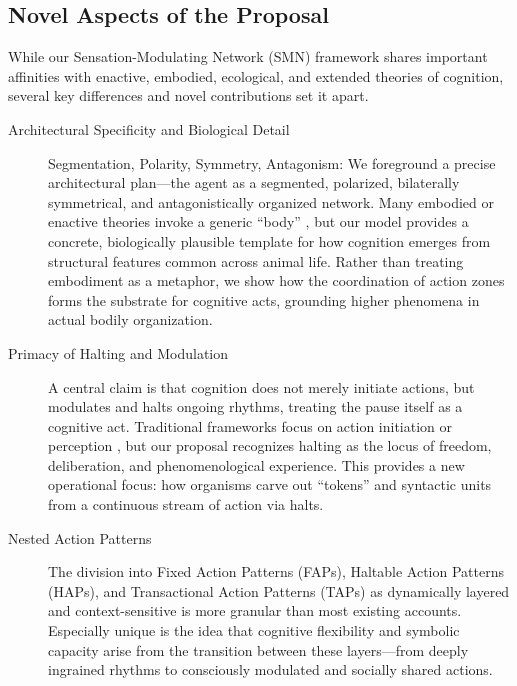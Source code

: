 \subsection{Novel Aspects of the Proposal}
While our Sensation-Modulating Network (SMN) framework shares important affinities with enactive, embodied, ecological, and extended theories of cognition, several key differences and novel contributions set it apart. 
\begin{description}
    \item[Architectural Specificity and Biological Detail] 
    Segmentation, Polarity, Symmetry, Antagonism: We foreground a precise architectural plan—the agent as a segmented, polarized, bilaterally symmetrical, and antagonistically organized network. Many embodied or enactive theories invoke a generic ``body'' \cite{clark1997being, gallagher2005how}, but our model provides a concrete, biologically plausible template for how cognition emerges from structural features common across animal life.      Rather than treating embodiment as a metaphor, we show how the coordination of action zones forms the substrate for cognitive acts, grounding higher phenomena in actual bodily organization.

    \item[Primacy of Halting and Modulation]
    A central claim is that cognition does not merely initiate actions, but modulates and halts ongoing rhythms, treating the pause itself as a cognitive act. Traditional frameworks focus on action initiation or perception \cite{fodor_modularity_1983, chomsky1965aspects}, but our proposal recognizes halting as the locus of freedom, deliberation, and phenomenological experience.  This provides a new operational focus: how organisms carve out “tokens” and syntactic units from a continuous stream of action via halts.

    \item[Nested Action Patterns] 
    The division into Fixed Action Patterns (FAPs), Haltable Action Patterns (HAPs), and Transactional Action Patterns (TAPs) as dynamically layered and context-sensitive is more granular than most existing accounts. Especially unique is the idea that cognitive flexibility and symbolic capacity arise from the transition between these layers—from deeply ingrained rhythms to consciously modulated and socially shared actions.


\end{description}
